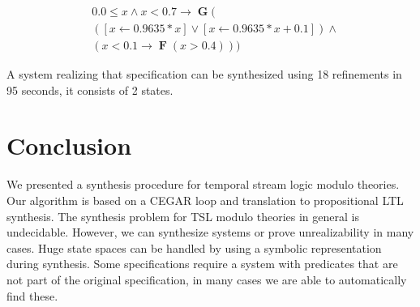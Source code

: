 \documentclass[runningheads]{llncs}
\newcommand{\eventually}{\operatorname{\mathbf{F}}}
\newcommand{\globally}{\operatorname{\mathbf{G}}}
\newcommand{\rarrow}{\boldsymbol{\rightarrow}}
\begin{document}



\begin{align*}
&0.0 \leq x \land x < 0.7 \rarrow \globally (\\
&([x \leftarrow 0.9635*x] \lor [x \leftarrow 0.9635*x + 0.1]) \land\\
&(x<0.1 \rightarrow \eventually (x>0.4)))
\end{align*}

A system realizing that specification can be synthesized using 18 refinements in 95 seconds, it consists of 2 states.

\section{Conclusion}
\label{sec:conclusion}
We presented a synthesis procedure for temporal stream logic modulo theories.
Our algorithm is based on a CEGAR \cite{clarke2000} loop and translation to propositional LTL synthesis.
The synthesis problem for TSL modulo theories in general is undecidable.
However, we can synthesize systems or prove unrealizability in many cases.
Huge state spaces can be handled by using a symbolic representation during synthesis.
Some specifications require a system with predicates that are not part of the original specification, in many cases we are able to automatically find these.



%
%


%
\end{document}
